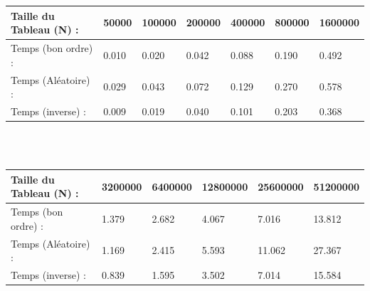 \documentclass[12pt]{article}
\begin{document}
\color{blue}
\textrm{  }
\\
\\
\begin{tabular}{|p{4cm}||p{1.8cm}|p{1.8cm}|p{1.8cm}|p{1.8cm}|p{1.8cm}|p{1.8cm}|}
\hline
Taille du Tableau (N) : & 50000 & 100000 & 200000 & 400000 & 800000  & 1600000\\
\hline
Temps (bon ordre) : & 0.010 & 0.020 &  0.042 & 0.088 &  0.190 & 0.492 \\
\hline

Temps (Aléatoire) : & 
0.029 &  0.043 & 0.072 &  0.129 & 0.270 & 0.578 \\
\hline

Temps (inverse) :  & 0.009 & 0.019 & 0.040 & 0.101 & 0.203 & 0.368 \\
\hline

\end{tabular}
\\
\\
\begin{tabular}{|p{4cm}||p{2.25cm}|p{2.25cm}|p{2.25cm}|p{2.25cm}|p{2.25cm}|}
\hline
Taille du Tableau (N) : & 3200000 & 6400000 & 12800000 & 25600000 &  51200000  \\
\hline

Temps (bon ordre) : &   1.379 & 2.682 & 4.067 &  7.016 & 13.812   \\
\hline

Temps (Aléatoire) : & 
1.169 & 2.415 & 5.593 & 11.062 & 27.367  \\
\hline

Temps (inverse) : & 0.839 & 1.595 & 3.502 & 7.014 & 15.584 \\
\hline

\end{tabular}
\color{black}
\end{document}
